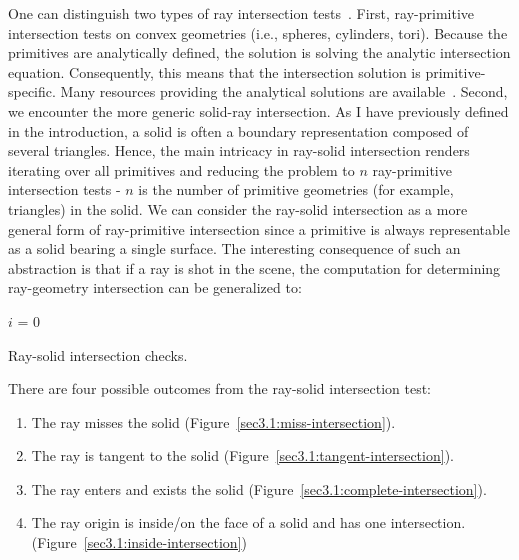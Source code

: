 \documentclass[a4paper,11pt,oneside]{article}
\begin{document}
One can distinguish two types of ray intersection tests~\cite{rasterization_scratch_pixel}. First, ray-primitive intersection tests on convex geometries (i.e., spheres, cylinders, tori). Because the primitives are analytically defined, the solution is solving the analytic intersection equation. Consequently, this means that the intersection solution is primitive-specific. Many resources providing the analytical solutions are available~\cite{ray_primitive_intersections}. Second, we encounter the more generic solid-ray intersection. As I have previously defined in the introduction, a solid is often a boundary representation composed of several triangles. Hence, the main intricacy in ray-solid intersection renders iterating over all primitives and reducing the problem to $n$ ray-primitive intersection tests - $n$ is the number of primitive geometries (for example, triangles) in the solid.
We can consider the ray-solid intersection as a more general form of ray-primitive intersection since a primitive is always representable as a solid bearing a single surface. The interesting consequence of such an abstraction is that if a ray is shot in the scene, the computation for determining ray-geometry intersection can be generalized to:

\begin{algorithm}[H]
	\SetAlgoLined
	$i$ = 0\;
	\caption{Ray-solid intersection checks.}
\end{algorithm}

There are four possible outcomes from the ray-solid intersection test:
\begin{enumerate}
	\item The ray misses the solid (Figure~\ref{sec3.1:miss-intersection}).
	\item The ray is tangent to the solid (Figure~\ref{sec3.1:tangent-intersection}).
	\item The ray enters and exists the solid (Figure~\ref{sec3.1:complete-intersection}).
	\item The ray origin is inside/on the face of a solid and has one intersection. (Figure~\ref{sec3.1:inside-intersection})
\end{enumerate}
\end{document}

